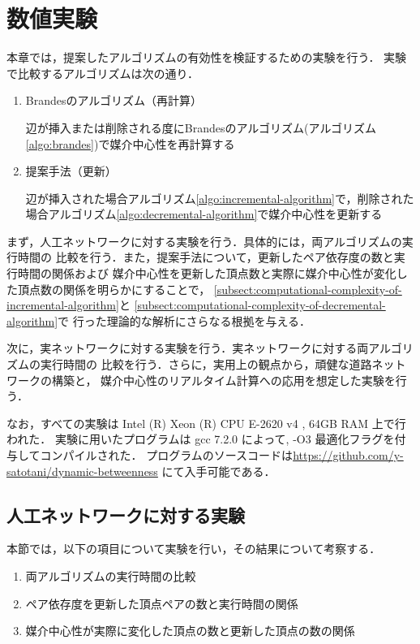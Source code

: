 \chapter{数値実験}
\label{chap:experiment}

本章では，提案したアルゴリズムの有効性を検証するための実験を行う．
実験で比較するアルゴリズムは次の通り．
\begin{enumerate}
\item Brandesのアルゴリズム（再計算）
  \par 辺が挿入または削除される度にBrandesのアルゴリズム(アルゴリズム\ref{algo:brandes})で媒介中心性を再計算する
\item 提案手法（更新）
  \par 辺が挿入された場合アルゴリズム\ref{algo:incremental-algorithm}で，削除された場合アルゴリズム\ref{algo:decremental-algorithm}で媒介中心性を更新する
\end{enumerate}

まず，人工ネットワークに対する実験を行う．具体的には，両アルゴリズムの実行時間の
比較を行う．また，提案手法について，更新したペア依存度の数と実行時間の関係および
媒介中心性を更新した頂点数と実際に媒介中心性が変化した頂点数の関係を明らかにすることで，
\ref{subsect:computational-complexity-of-incremental-algorithm}と
\ref{subsect:computational-complexity-of-decremental-algorithm}で
行った理論的な解析にさらなる根拠を与える．

次に，実ネットワークに対する実験を行う．実ネットワークに対する両アルゴリズムの実行時間の
比較を行う．さらに，実用上の観点から，頑健な道路ネットワークの構築と，
媒介中心性のリアルタイム計算への応用を想定した実験を行う．

なお，すべての実験は Intel (R) Xeon (R) CPU E-2620 v4 , 64GB RAM 上で行われた．
実験に用いたプログラムは gcc 7.2.0 によって, -O3 最適化フラグを付与してコンパイルされた．
プログラムのソースコードは\url{https://github.com/y-satotani/dynamic-betweenness}
にて入手可能である．

\section{人工ネットワークに対する実験}
\label{sect:exp-artificial}

本節では，以下の項目について実験を行い，その結果について考察する．
\begin{enumerate}
\item 両アルゴリズムの実行時間の比較
\item ペア依存度を更新した頂点ペアの数と実行時間の関係
\item 媒介中心性が実際に変化した頂点の数と更新した頂点の数の関係
\end{enumerate}

